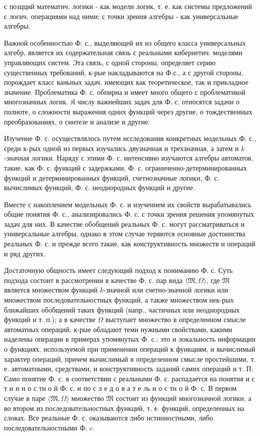 \documentclass[10pt]{article}
\begin{document}
с позцций математич. логики - как модели логик, т. е. как системы предложений с логич. операциями над ними; с точки зрения алгебры - как универсальные алгебры.



Важной особенностью Ф. с., выделяющей их из общего класса универсальных алгебр, является их содержательная связь с реальными кибернетич. моделями управляющих систем. Эта связь, с одной стороны, определяет серию существенных требований, к-рые накладываются на Ф.с., а с другой стороны, порождает класс ваньных задач, имеющих как теоретическое, так и прикладное значение. Проблематика Ф. с. обпирна и имеет много общего с проблематикой многозначных логик. $\mathfrak{K}$ числу важнейших задач для Ф. с. относятся задачи о полноте, о сложности выражения одних функций через другие, о тождественных преобразованиях, о синтезе и анализе и другие.



Изучение Ф. с. осуществлялось путем исследования конкретных модельных Ф. с., среди к-рых одной из первых изучались двузначная и трехзначная, а затем и $k$-значная логики. Наряду с этими Ф. с. интенсивно изучаются алгебры автоматов, такие, как Ф. с. функций с задержками, Ф. с. ограниченно-детерминированных функций и детерминированных функций, счетнозначные логики, Ф. с. вычислимых функций, Ф. с. неоднородных функций и другие.



Вместе с накоплением модельных Ф. с. и изучением их свойств вырабатывались общие понятия Ф. с., анализировались Ф. с. с точки зрения решения упомянутых задач для них. В качестве обобщений реальных Ф. с. могут рассматриваться и универсальные алгебры, однако в этом случае теряются основные достоинства реальных Ф. с. и прежде всего такие, как конструктивность множеств и операций и ряд других.



Достаточную общность имеет следующий подход к пониманию Ф. с. Суть подхода состоит в рассмотрении в качестве Ф. с. пар вида $\langle\mathfrak{M}, \Omega\rangle$, где $\mathfrak{M}$ является множеством функций $k$-значной или счетно-значной логики или множеством последовательностных функций, а также множеством нек-рых ближайших обобщений таких функций (напр., частичных или неоднородных функций и т. п.); а в качестве $\Omega$ выступает множество в определенном смысле автоматных операций, к-рые обладают теми нужными свойствами, какими наделены операции в примерах упомянутых Ф. с.: это и локальность информации о функциях, используемой при применении операций к функциям, и вычислимый характер операций, причем вычислимый в определенном смысле простейшими, т. е. автоматными, средствами, и конструктивность заданий самих операций и т. П. Само понятие Ф. с. в соответствии с реальными Ф. с. распадается на понятия и с т и н н о с тн $о$ й Ф. с. и по с л е д о в а т е ль н о с тн о й Ф. с. В первом случае в паре $\langle\mathfrak{M}, \Omega\rangle$ множество $\mathfrak{M}$ состоит из функций многозначной логики, а во втором из последовательностных функций, т. е. функций, определенных на словах. Все реальные Ф. с. оказываются либо истинностными, либо последовательностными Ф. c.
\end{document}
